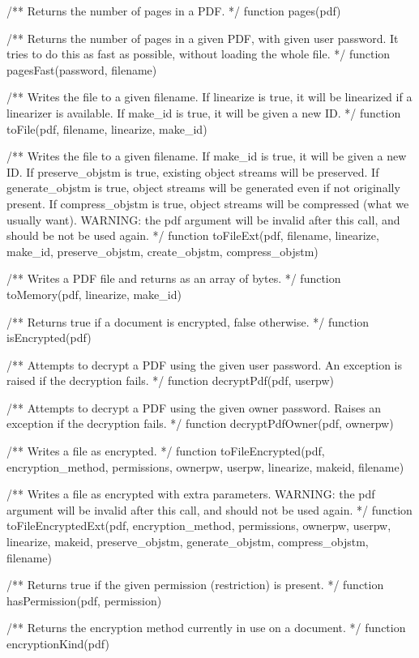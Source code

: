 /** Returns the number of pages in a PDF. */
function pages(pdf)

/** Returns the number of pages in a given PDF, with given user password. It
tries to do this as fast as possible, without loading the whole file. */
function pagesFast(password, filename)

/** Writes the file to a given filename. If linearize is true, it will be
linearized if a linearizer is available. If make_id is true, it will be
given a new ID. */
function toFile(pdf, filename, linearize, make_id)

/** Writes the file to a given filename. If make_id is true, it will be given
a new ID.  If preserve_objstm is true, existing object streams will be
preserved. If generate_objstm is true, object streams will be generated even if
not originally present. If compress_objstm is true, object streams will be
compressed (what we usually want). WARNING: the pdf argument will be invalid
after this call, and should be not be used again. */
function toFileExt(pdf, filename, linearize, make_id, preserve_objstm,
                   create_objstm, compress_objstm)

/** Writes a PDF file and returns as an array of bytes. */
function toMemory(pdf, linearize, make_id)

/** Returns true if a document is encrypted, false otherwise. */
function isEncrypted(pdf)

/** Attempts to decrypt a PDF using the given user password. An exception is
raised if the decryption fails. */
function decryptPdf(pdf, userpw)

/** Attempts to decrypt a PDF using the given owner password. Raises an
exception if the decryption fails. */
function decryptPdfOwner(pdf, ownerpw)

/** Writes a file as encrypted. */
function toFileEncrypted(pdf, encryption_method, permissions, ownerpw, userpw,
                         linearize, makeid, filename)

/** Writes a file as encrypted with extra parameters. WARNING: the pdf argument
will be invalid after this call, and should not be used again. */
function toFileEncryptedExt(pdf, encryption_method, permissions, ownerpw, userpw,
                            linearize, makeid, preserve_objstm, generate_objstm,
                            compress_objstm, filename)

/** Returns true if the given permission (restriction) is present. */
function hasPermission(pdf, permission)

/** Returns the encryption method currently in use on a document. */
function encryptionKind(pdf)

